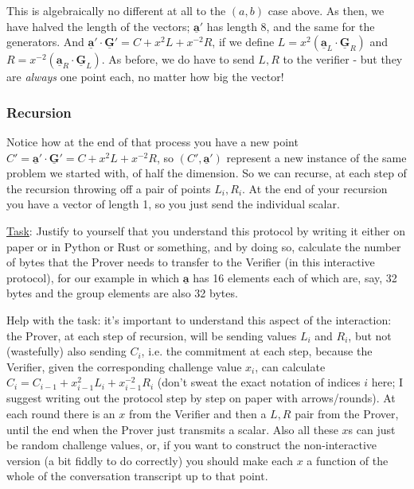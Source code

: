 \documentclass[10pt,a4paper]{article}
\begin{document}
\vspace{5 pt}

This is algebraically no different at all to the $(a, b)$ case above. As then, we have halved the length of the vectors; $\underline{\textbf{a}}'$ has length 8, and the same for the generators. And $\underline{\textbf{a}}' \cdot \underline{\textbf{G}}' = C + x^2L + x^{-2}R$, if we define $L = x^2(\underline{\textbf{a}}_L \cdot \underline{\textbf{G}}_R)$ and $R = x^{-2}(\underline{\textbf{a}}_R \cdot \underline{\textbf{G}}_L)$. As before, we do have to send $L, R$ to the verifier - but they are \emph{always} one point each, no matter how big the vector!

\subsubsection{Recursion}

Notice how at the end of that process you have a new point $C' = \underline{\textbf{a}}' \cdot \underline{\textbf{G}}' = C + x^2L + x^{-2}R$, so $(C', \underline{\textbf{a}}')$ represent a new instance of the same problem we started with, of half the dimension. So we can recurse, at each step of the recursion throwing off a pair of points $L_i, R_i$. At the end of your recursion you have a vector of length 1, so you just send the individual scalar.

\vspace{5 pt}

\begin{framed}
\underline{Task}: Justify to yourself that you understand this protocol by writing it either on paper or in Python or Rust or something, and by doing so, calculate the number of bytes that the Prover needs to transfer to the Verifier (in this interactive protocol), for our example in which $\underline{\textbf{a}}$ has 16 elements each of which are, say, 32 bytes and the group elements are also 32 bytes.
\end{framed}

\vspace{5 pt}

Help with the task: it's important to understand this aspect of the interaction: the Prover, at each step of recursion, will be sending values $L_i$ and $R_i$, but not (wastefully) also sending $C_i$, i.e. the commitment at each step, because the Verifier, given the corresponding challenge value $x_i$, can calculate $C_i = C_{i-1} + x_{i-1}^2 L_i + x_{i-1}^{-2} R_i$ (don't sweat the exact notation of indices $i$ here; I suggest writing out the protocol step by step on paper with arrows/rounds). At each round there is an $x$ from the Verifier and then a $L, R$ pair from the Prover, until the end when the Prover just transmits a scalar. Also all these $x$s can just be random challenge values, or, if you want to construct the non-interactive version (a bit fiddly to do correctly) you should make each $x$ a function of the whole of the conversation transcript up to that point.
\end{document}
